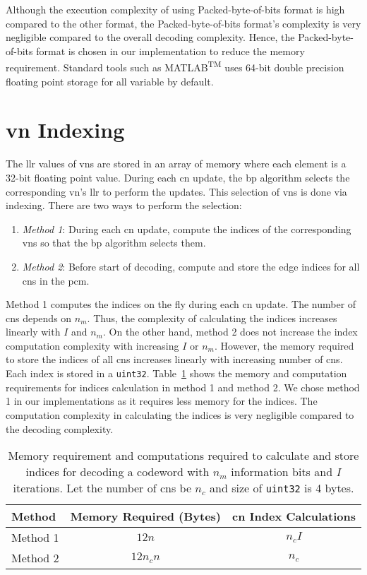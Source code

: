 Although the execution complexity of using Packed-byte-of-bits format is high compared to the other format, the Packed-byte-of-bits format's complexity is very negligible compared to the overall decoding complexity. Hence, the Packed-byte-of-bits format is chosen in our implementation to reduce the memory requirement. Standard tools such as MATLAB\textsuperscript{TM} uses 64-bit double precision floating point storage for all variable by default.

\section{\acrlong{vn} Indexing}
The \gls{llr} values of \glspl{vn} are stored in an array of memory where each element is a 32-bit floating point value. During each \gls{cn} update, the \gls{bp} algorithm selects the corresponding \gls{vn}'s \gls{llr} to perform the updates. This selection of \glspl{vn} is done via indexing. There are two ways to perform the selection:
\begin{enumerate}
  \item \emph{Method 1}: During each \gls{cn} update, compute the indices of the corresponding \glspl{vn} so that the \gls{bp} algorithm selects them.
  \item \emph{Method 2}: Before start of decoding, compute and store the edge indices for all \glspl{cn} in the \gls{pcm}.
\end{enumerate}

Method 1 computes the indices on the fly during each \gls{cn} update. The number of \glspl{cn} depends on $n_m$. Thus, the complexity of calculating the indices increases linearly with $I$ and $n_m$. On the other hand, method 2 does not increase the index computation complexity with increasing $I$ or $n_m$. However, the memory required to store the indices of all \glspl{cn} increases linearly with increasing number of \glspl{cn}. Each index is stored in a \texttt{uint32}. Table~\ref{tab:idx_com} shows the memory and computation requirements for indices calculation in method 1 and method 2. We chose method 1 in our implementations as it requires less memory for the indices. The computation complexity in calculating the indices is very negligible compared to the decoding complexity.
\begin{table}[htbp]
  \centering
  \begin{tabular}{|l|c|c|}
    \hline
    \textbf{Method} &\textbf{Memory Required (Bytes)} &\textbf{\gls{cn} Index Calculations}\\
    \hline
    \hline
    Method 1 &$12n$ &$n_c I$\\
    \hline
    Method 2 &$12n_cn$ &$n_c$\\
    \hline
  \end{tabular}
  \caption[Memory and complexity of different \acrshort{vn} indexing technieqes.]{Memory requirement and computations required to calculate and store indices for decoding a codeword with $n_m$ information bits and $I$ iterations. Let the number of \glspl{cn} be $n_c$ and size of \texttt{uint32} is 4 bytes.}
  \label{tab:idx_com}
\end{table}
 